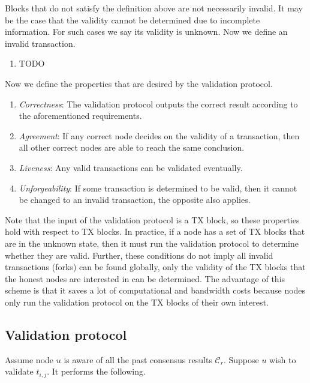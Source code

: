 Blocks that do not satisfy the definition above are not necessarily invalid. It
may be the case that the validity cannot be determined due to incomplete
information. For such cases we say its validity is unknown.
Now we define an invalid transaction.

\begin{enumerate}
\item TODO
\end{enumerate}

Now we define the properties that are desired by the validation protocol.
\begin{enumerate}
\item \emph{Correctness}: The validation protocol outputs the correct result
  according to the aforementioned requirements.
\item \emph{Agreement}: If any correct node decides on the validity of a 
  transaction, then all other correct nodes are able to reach the same
  conclusion.
\item \emph{Liveness}: Any valid transactions can be validated eventually.
\item \emph{Unforgeability}: If some transaction is determined to be valid, then
  it cannot be changed to an invalid transaction, the opposite also applies.
\end{enumerate}

Note that the input of the validation protocol is a TX block, so these
properties hold with respect to TX blocks. In practice, if a node has a set of
TX blocks that are in the unknown state, then it must run the validation
protocol to determine whether they are valid. Further, these conditions do not
imply all invalid transactions (forks) can be found globally, only the validity
of the TX blocks that the honest nodes are interested in can be determined. The
advantage of this scheme is that it saves a lot of computational and bandwidth
costs because nodes only run the validation protocol on the TX blocks of their
own interest.

\subsection{Validation protocol}
Assume node $u$ is aware of all the past consensus results $\mathcal{C}_r$.
Suppose $u$ wish to validate $t_{i,j}$. It performs the following.

